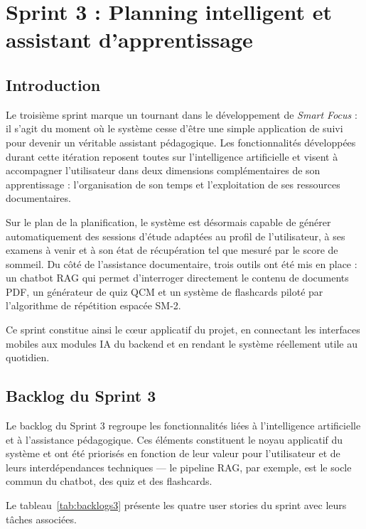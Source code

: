 \chapter{Sprint 3 : Planning intelligent et assistant d'apprentissage}
\label{chap:sprint3}

\section{Introduction}

Le troisième sprint marque un tournant dans le développement de \textit{Smart Focus} :
il s'agit du moment où le système cesse d'être une simple application de suivi pour
devenir un véritable assistant pédagogique. Les fonctionnalités développées durant cette
itération reposent toutes sur l'intelligence artificielle et visent à accompagner
l'utilisateur dans deux dimensions complémentaires de son apprentissage : l'organisation
de son temps et l'exploitation de ses ressources documentaires.

Sur le plan de la planification, le système est désormais capable de générer
automatiquement des sessions d'étude adaptées au profil de l'utilisateur, à ses examens
à venir et à son état de récupération tel que mesuré par le score de sommeil. Du côté
de l'assistance documentaire, trois outils ont été mis en place : un chatbot RAG qui
permet d'interroger directement le contenu de documents PDF, un générateur de quiz QCM
et un système de flashcards piloté par l'algorithme de répétition espacée SM-2.

Ce sprint constitue ainsi le cœur applicatif du projet, en connectant les interfaces
mobiles aux modules IA du backend et en rendant le système réellement utile au quotidien.

\section{Backlog du Sprint 3}

Le backlog du Sprint 3 regroupe les fonctionnalités liées à l'intelligence artificielle
et à l'assistance pédagogique. Ces éléments constituent le noyau applicatif du système
et ont été priorisés en fonction de leur valeur pour l'utilisateur et de leurs
interdépendances techniques — le pipeline RAG, par exemple, est le socle commun
du chatbot, des quiz et des flashcards.

Le tableau~\ref{tab:backlogs3} présente les quatre user stories du sprint avec leurs
tâches associées.

